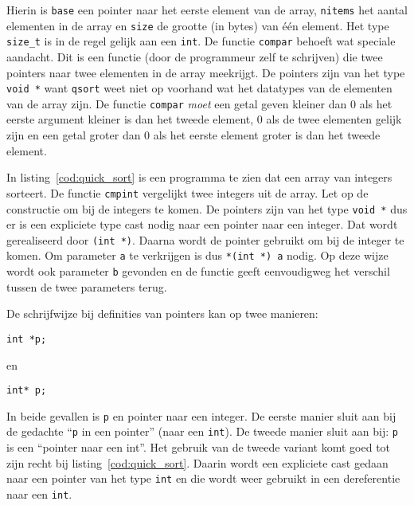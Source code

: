 Hierin is \texttt{base} een pointer naar het eerste element van de array, \texttt{nitems} het aantal elementen in de array en \texttt{size} de grootte (in bytes) van één element. Het type \texttt{size\_t} is in de regel gelijk aan een \texttt{int}. De functie \texttt{compar} behoeft wat speciale aandacht. Dit is een functie (door de programmeur zelf te schrijven) die twee pointers naar twee elementen in de array meekrijgt. De pointers zijn van het type \texttt{void~*} want \texttt{qsort} weet niet op voorhand wat het datatypes van de elementen van de array zijn. De functie \texttt{compar} \textsl{moet} een getal geven kleiner dan 0 als het eerste argument kleiner is dan het tweede element, 0 als de twee elementen gelijk zijn en een getal groter dan 0 als het eerste element groter is dan het tweede element.

In listing~\ref{cod:quick_sort} is een programma te zien dat een array van integers sorteert. De functie \texttt{cmpint} vergelijkt twee integers uit de array. Let op de constructie om bij de integers te komen. De pointers zijn van het type \texttt{void~*} dus er is een expliciete type cast nodig naar een pointer naar een integer. Dat wordt gerealiseerd door \texttt{(int~*)}. Daarna wordt de pointer gebruikt om bij de integer te komen. Om parameter \texttt{a} te verkrijgen is dus \texttt{*(int~*)~a} nodig. Op deze wijze wordt ook parameter \texttt{b} gevonden en de functie geeft eenvoudigweg het verschil tussen de twee parameters terug.



\begin{infobox}
De schrijfwijze bij definities van pointers kan op twee manieren:

\hspace*{1em}\texttt{int *p;}

en

\hspace*{1em}\texttt{int* p;}

In beide gevallen is \texttt{p} en pointer naar een integer. De eerste manier sluit aan bij de gedachte ``\texttt{p} in een pointer'' (naar een \texttt{int}). De tweede manier sluit aan bij: \texttt{p} is een ``pointer naar een int''. Het gebruik van de tweede variant komt goed tot zijn recht bij listing~\ref{cod:quick_sort}. Daarin wordt een expliciete cast gedaan naar een pointer van het type \texttt{int} en die wordt weer gebruikt in een dereferentie naar een \texttt{int}.
\end{infobox}


